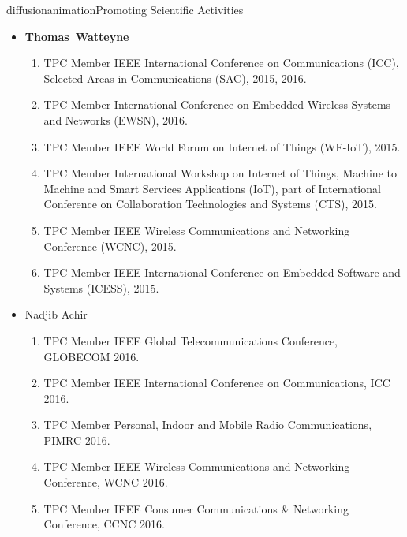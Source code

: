 \documentclass{ra2016}
\newcommand{\thomas}  {\textbf{Thomas~Watteyne}}
\begin{document}
\begin{module}{diffusion}{animation}{Promoting Scientific Activities}
\begin{itemize}
\begin{enumerate}
            \item TPC Member PECCS 2015, 5th international conference on Pervasive and Embedded Computing and Communication Systems, February 2015.
            \item TPC Member RAWSN 2015, 3rd International Workshop on RFID And Adaptive Wireless Sensor Networks, May 2015.
            \item TPC Member RTNS 2015, 23th International Conference on Real-Time and Network Systems, November 2015.
            \item TPC Member WINCOM 2015, 1st International Conference on Wireless Networks and Mobile Communications, October 2015.
        \end{enumerate}
    \item \thomas
        \begin{enumerate}
            \item TPC Member IEEE International Conference on Communications (ICC), Selected Areas in Communications (SAC), 2015, 2016.
            \item TPC Member International Conference on Embedded Wireless Systems and Networks (EWSN), 2016.
            \item TPC Member IEEE World Forum on Internet of Things (WF-IoT), 2015.
            \item TPC Member International Workshop on Internet of Things, Machine to Machine and Smart Services Applications (IoT), part of International Conference on  Collaboration Technologies and Systems (CTS), 2015.
            \item TPC Member IEEE Wireless Communications and Networking Conference (WCNC), 2015.
            \item TPC Member IEEE International Conference on Embedded Software and Systems (ICESS), 2015.
        \end{enumerate}
    \item Nadjib Achir
        \begin{enumerate}
            \item TPC Member IEEE Global Telecommunications Conference, GLOBECOM 2016.
            \item TPC Member IEEE International Conference on Communications, ICC 2016.
            \item TPC Member Personal, Indoor and Mobile Radio Communications, PIMRC 2016.
            \item TPC Member IEEE Wireless Communications and Networking Conference, WCNC 2016.
            \item TPC Member IEEE Consumer Communications \& Networking Conference, CCNC 2016.

\end{enumerate}
\end{itemize}
\end{module}
\end{document}
